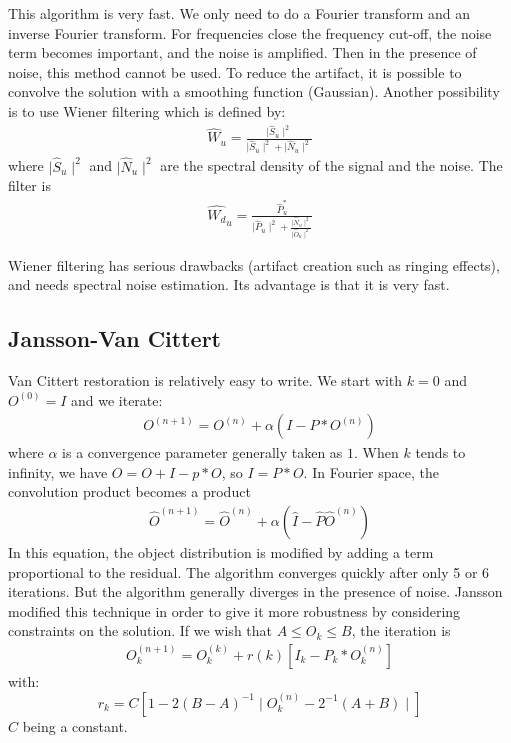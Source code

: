 This algorithm is very fast. We only need to do a Fourier transform
 and an inverse Fourier transform. For frequencies close the frequency
 cut-off, the noise term becomes important, and the noise is amplified.
 Then in the presence of noise, this method cannot be used.
 To reduce the artifact, it is possible to convolve the solution with a 
 smoothing function (Gaussian). Another possibility 
is to use Wiener filtering
 which is defined by:   
 \begin{eqnarray}
\hat{W}_u = \frac{\mid \hat{S}_u \mid^2 }{\mid \hat{S}_u \mid^2 + \mid \hat{N}_u\mid^2}
\end{eqnarray}
where $\mid \hat{S}_u \mid^2 $ and  $\mid \hat{N}_u\mid^2$  are
the spectral density of the signal and the noise. The filter is
\begin{eqnarray}
\hat{W_d}_u = \frac{ 
    \hat{P}^*_u} {\mid\hat{P}_u\mid^2+ \frac{\mid\hat{N}_u\mid^2}{\mid\hat{O}_u\mid^2}}
\end{eqnarray}

\bigskip
Wiener filtering has serious drawbacks (artifact creation such as ringing
effects), and  needs spectral noise estimation. Its advantage is that it
is very fast.
 
\subsection*{Jansson-Van Cittert}
 
Van Cittert \cite{rest:vancittert31}  restoration is relatively easy to write.
We start with $k=0$ and $O^{(0)} = I$ and we iterate:
\begin{eqnarray}
O^{(n+1)}  = O^{(n)}  + \alpha(I - P * O^{(n)})
\label{vanvan}
\end{eqnarray}
where $\alpha$ is a convergence parameter generally taken as $1$.
When $k$ tends to infinity, we have $O = O + I - p * O$, so $I = P * O$. In
Fourier space, the convolution product becomes a product 
\begin{eqnarray}
\hat{O}^{(n+1)} = \hat{O}^{(n)}  + \alpha(\hat{I} - \hat{P}  \hat{O}^{(n)})
\end{eqnarray}
In this equation, the object distribution is modified by adding a term
proportional to the residual. The algorithm converges quickly after only
5 or 6 iterations. But the algorithm generally diverges in the
presence of noise. Jansson \cite{rest:jansson68} 
modified this technique in order to give it
more robustness by considering constraints on the solution. If we wish
that $ A \leq O_k \leq B$, the iteration is
\begin{eqnarray}
O^{(n+1)}_k = O^{(k)}_k + r(k)[I_k - P_k * O^{(n)}_k]
\end{eqnarray}
with:
\[r_k = C[1 - 2(B-A)^{-1}\mid O^{(n)}_k - 2^{-1}(A+B)\mid]\]
$C$ being a constant.

